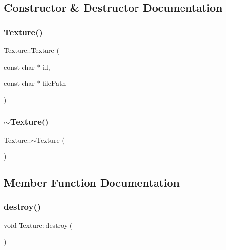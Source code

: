 \subsection{Constructor \& Destructor Documentation}
\mbox{\label{class_texture_a09b74fe4a769d09eb0dc6ce263fb21e8}} 
\subsubsection{\texorpdfstring{Texture()}{Texture()}}
{\footnotesize\ttfamily Texture\+::\+Texture (\begin{DoxyParamCaption}\item[{const char $\ast$}]{id,  }\item[{const char $\ast$}]{file\+Path }\end{DoxyParamCaption})}

\mbox{\label{class_texture_a09c4bcb7462f64c1d20fa69dba3cee8a}} 
\subsubsection{\texorpdfstring{$\sim$\+Texture()}{~Texture()}}
{\footnotesize\ttfamily Texture\+::$\sim$\+Texture (\begin{DoxyParamCaption}{ }\end{DoxyParamCaption})\hspace{0.3cm}{\ttfamily [virtual]}}



\subsection{Member Function Documentation}
\mbox{\label{class_texture_a9885329fec4191d5a7aee3d198519ea9}} 
\subsubsection{\texorpdfstring{destroy()}{destroy()}}
{\footnotesize\ttfamily void Texture\+::destroy (\begin{DoxyParamCaption}{ }\end{DoxyParamCaption})\hspace{0.3cm}{\ttfamily [private]}}

